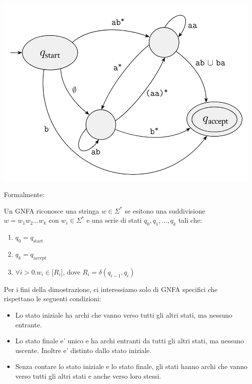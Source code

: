 \begin{center}
  \includegraphics[scale=0.3]{img/2024-12-16-18-28-52.png}
\end{center}
Formalmente:
 
Un GNFA riconosce una stringa $ w \in \Sigma^* $ se esitono una suddivisione $ w = w_1w_2...w_k $ con $ w_i \in \Sigma^* $ e una serie di stati $ q_0,q_1,...,q_k $ tali che:
\begin{enumerate}
  \item $ q_0 = q_{\text{start}} $
  \item $ q_k = q_{\text{accept}} $
  \item $ \forall i > 0. w_i \in \mathcal[R_i] $, dove $ R_i = \delta(q_{i-1}, q_i) $
\end{enumerate}


Per i fini della dimostrazione, ci interessiamo solo di GNFA specifici che rispettano le seguenti condizioni:
\begin{itemize}
  \item Lo stato iniziale ha archi che vanno verso tutti gli altri stati, ma nessuno entrante.
  \item Lo stato finale e' unico e ha archi entranti da tutti gli altri stati, ma nessuno uscente. Inoltre e' distinto dallo stato iniziale.
  \item Senza contare lo stato iniziale e lo stato finale, gli stati hanno archi che vanno verso tutti gli altri stati e anche verso loro stessi.
\end{itemize}

